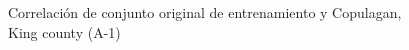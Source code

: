 \begin{figure}[H]
    \centering
    
    \caption{Correlación de conjunto original de entrenamiento y Copulagan, King county (A-1)}
    \label{pairwise-king county-a-1-copulagan}
\end{figure}